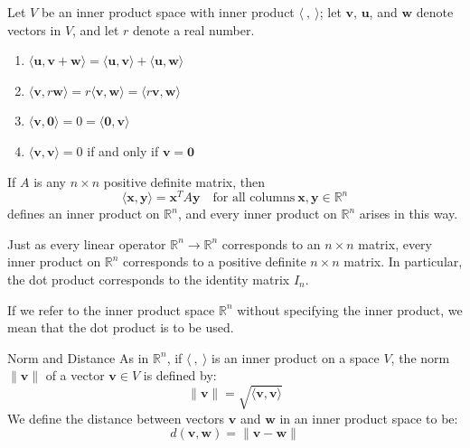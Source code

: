 \documentclass[12pt]{article}
\begin{document}
\begin{theorem}
    Let $ V $ be an inner product space with inner product $ \langle \ , \ \rangle $; let $ \mathbf{v} $, $ \mathbf{u} $, and $ \mathbf{w} $ denote vectors in $ V $, and let $ r $ denote a real number.
    \begin{enumerate}[label=(\roman*)]
        \item $ \langle \mathbf{u}, \mathbf{v} + \mathbf{w} \rangle = \langle \mathbf{u}, \mathbf{v} \rangle + \langle \mathbf{u}, \mathbf{w} \rangle $
        \item $ \langle \mathbf{v}, r \mathbf{w} \rangle = r \langle \mathbf{v}, \mathbf{w} \rangle = \langle r \mathbf{v}, \mathbf{w} \rangle $
        \item $ \langle \mathbf{v}, \mathbf{0} \rangle = 0 = \langle \mathbf{0}, \mathbf{v} \rangle $
        \item $ \langle \mathbf{v}, \mathbf{v} \rangle = 0 $ if and only if $ \mathbf{v} = \mathbf{0} $
    \end{enumerate}
\end{theorem}

\begin{theorem}{}{}
    If $ A $ is any $ n \times n $ positive definite matrix, then
    \[ \langle \mathbf{x}, \mathbf{y} \rangle = \mathbf{x}^T A \mathbf{y} \quad \text{for all columns} \ \mathbf{x}, \mathbf{y} \in \mathbb{R}^n \]
    defines an inner product on $ \mathbb{R}^n $, and every inner product on $ \mathbb{R}^n $ arises in this way.
\end{theorem}

\begin{note}{}{}
    Just as every linear operator $ \mathbb{R}^n \to \mathbb{R}^n $ corresponds to an $ n \times n $ matrix, every inner product on $ \mathbb{R}^n $ corresponds to a positive definite $ n \times n $ matrix. In particular, the dot product corresponds to the identity matrix $ I_n $.
\end{note}

\begin{remark}{}{}
    If we refer to the inner product space $ \mathbb{R}^n $ without specifying the inner product, we mean that the dot product is to be used.
\end{remark}

\begin{definition}{Norm and Distance}{}
    As in $ \mathbb{R}^n $, if $ \langle \ , \ \rangle $ is an inner product on a space $ V $, the norm $ \lVert \mathbf{v} \rVert $ of a vector $ \mathbf{v} \in V $ is defined by:
    \[ \lVert \mathbf{v} \rVert = \sqrt{ \langle \mathbf{v}, \mathbf{v} \rangle } \]
    We define the distance between vectors $ \mathbf{v} $ and $ \mathbf{w} $ in an inner product space to be:
    \[ d \left( \mathbf{v}, \mathbf{w} \right) = \lVert \mathbf{v} - \mathbf{w} \rVert \]
\end{definition}
\end{document}
